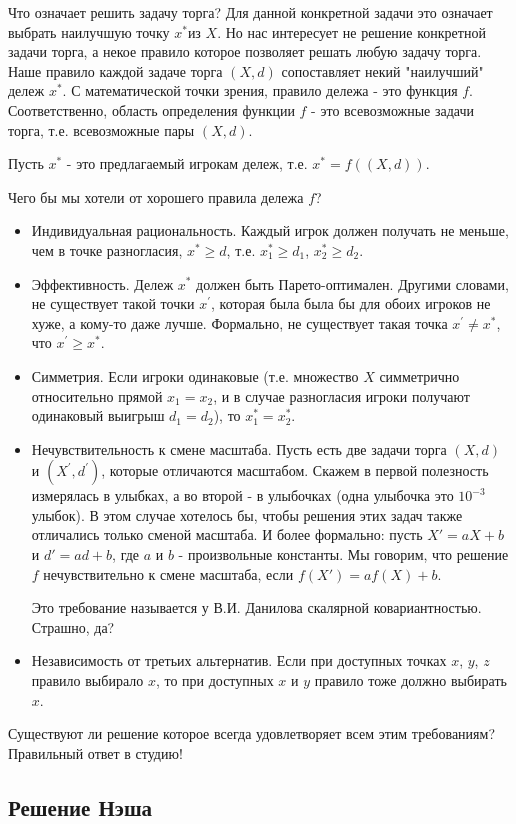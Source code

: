 Что означает решить задачу торга? Для данной конкретной задачи это
означает выбрать наилучшую точку $x^{*}$из $X$. Но нас интересует
не решение конкретной задачи торга, а некое правило которое позволяет
решать любую задачу торга. Наше правило каждой задаче торга $(X,d)$
сопоставляет некий "наилучший" дележ $x^{*}$. С математической
точки зрения, правило дележа - это функция $f$. Соответственно, область
определения функции $f$ - это всевозможные задачи торга, т.е. всевозможные
пары $(X,d)$. 

Пусть $x^{*}$ - это предлагаемый игрокам дележ, т.е. $x^{*}=f((X,d))$.

Чего бы мы хотели от хорошего правила дележа $f$?
\begin{itemize}
\item Индивидуальная рациональность. Каждый игрок должен получать не меньше,
чем в точке разногласия, $x^{*}\geq d$, т.е. $x_{1}^{*}\geq d_{1}$,
$x_{2}^{*}\geq d_{2}$.
\item Эффективность. Дележ $x^{*}$ должен быть Парето-оптимален. Другими
словами, не существует такой точки $x^{'}$, которая была была бы
для обоих игроков не хуже, а кому-то даже лучше. Формально, не существует
такая точка $x^{'}\neq x^{*}$, что $x^{'}\geq x^{*}$.
\item Симметрия. Если игроки одинаковые (т.е. множество $X$ симметрично
относительно прямой $x_{1}=x_{2}$, и в случае разногласия игроки
получают одинаковый выигрыш $d_{1}=d_{2}$), то $x_{1}^{*}=x_{2}^{*}$.
\item Нечувствительность к смене масштаба. Пусть есть две задачи торга $(X,d)$
и $(X^{'},d^{'})$, которые отличаются масштабом. Скажем в первой
полезность измерялась в улыбках, а во второй - в улыбочках (одна улыбочка
это $10^{-3}$ улыбок). В этом случае хотелось бы, чтобы решения этих
задач также отличались только сменой масштаба. И более формально:
пусть $X'=aX+b$ и $d'=ad+b$, где $a$ и $b$ - произвольные константы.
Мы говорим, что решение $f$ нечувствительно к смене масштаба, если
$f(X')=af(X)+b$.

Это требование называется у В.И. Данилова скалярной ковариантностью.
Страшно, да?
\item Независимость от третьих альтернатив. Если при доступных точках $x$,
$y$, $z$ правило выбирало $x$, то при доступных $x$ и $y$ правило
тоже должно выбирать $x$.
\end{itemize}
Существуют ли решение которое всегда удовлетворяет всем этим требованиям?
Правильный ответ в студию!


\subsection{Решение Нэша}

